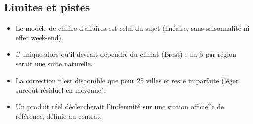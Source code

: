 \documentclass[11pt,a4paper]{article}
\begin{document}
\subsection{Limites et pistes}
\begin{itemize}
  \item Le modèle de chiffre d'affaires est celui du sujet (linéaire, sans saisonnalité ni effet week-end).
  \item $\beta$ unique alors qu'il devrait dépendre du climat (Brest) ; un $\beta$ par région serait une suite naturelle.
  \item La correction n'est disponible que pour 25 villes et reste imparfaite (léger surcoût résiduel en moyenne).
  \item Un produit réel déclencherait l'indemnité sur une station officielle de référence, définie au contrat.
\end{itemize}
\end{document}
